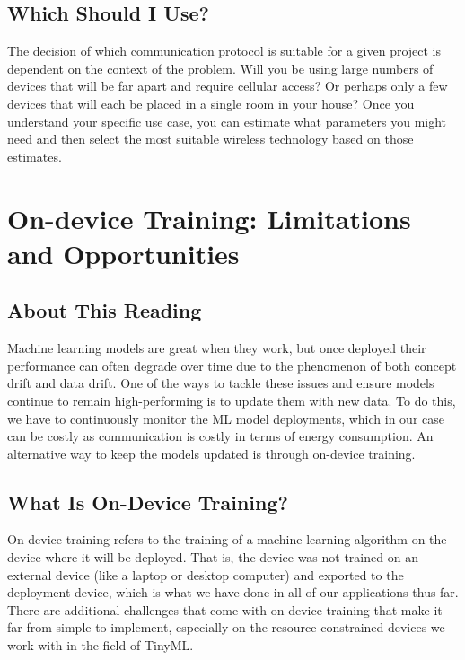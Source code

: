 {{{{{{{{{    \subsection{Which Should I Use?}
    
    The decision of which communication protocol is suitable for a given project is dependent on the context of the problem. Will you be using large numbers of devices that will be far apart and require cellular access? Or perhaps only a few devices that will each be placed in a single room in your house? Once you understand your specific use case, you can estimate what parameters you might need and then select the most suitable wireless technology based on those estimates.  
        
\section{On-device Training: Limitations and Opportunities}


\subsection{About This Reading}

    Machine learning models are great when they work, but once deployed their performance can often degrade over time due to the phenomenon of both concept drift and data drift. One of the ways to tackle these issues and ensure models continue to remain high-performing is to update them with new data. To do this, we have to continuously monitor the ML model deployments, which in our case can be costly as communication is costly in terms of energy consumption. An alternative way to keep the models updated is through on-device training.
    
    \subsection{What Is On-Device Training?}
    
    On-device training refers to the training of a machine learning algorithm on the device where it will be deployed. That is, the device was not trained on an external device (like a laptop or desktop computer) and exported to the deployment device, which is what we have done in all of our applications thus far. There are additional challenges that come with on-device training that make it far from simple to implement, especially on the resource-constrained devices we work with in the field of TinyML.
    
}}}}}}}}}
